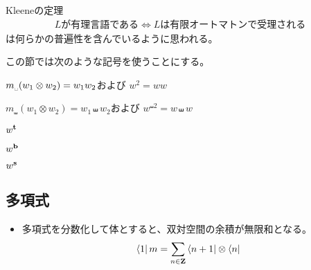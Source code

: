 	Kleeneの定理
	\begin{equation*}\begin{split}
		\text{$L$が有理言語である}
		\iff \text{$L$は有限オートマトンで受理される}
	\end{split}\end{equation*}
	は何らかの普遍性を含んでいるように思われる。

	この節では次のような記号を使うことにする。
	\begin{description}\setlength{\itemsep}{-1mm} %
		\item[連結による積] $m_\myspace(w_1\otimes w_2)=w_1w_2$および
		$w^2=ww$
		\item[シャッフル積] $m_\shuffle(w_1\otimes w_2)=w_1\shuffle w_2$および
		$w^{\shuffle2}=w\shuffle w$
		\item[転置] $w^{\mathbf{t}}$
		\item[Brzozowski微分] $w^{\mathbf{b}}$
		\item[シャッフル微分] $w^{\mathbf{s}}$
	\end{description} %

\subsection{多項式}\label{s2:多項式} %
	\begin{itemize}\setlength{\itemsep}{-1mm} %
		\item 多項式を分数化して体とすると、双対空間の余積が無限和となる。
		\begin{equation*}\begin{split}
			\mathinner{\langle{1}|}m = \sum_{n\in\mathbf{Z}}\mathinner{\langle{n+1}|}\otimes\mathinner{\langle{n}|}
		\end{split}\end{equation*}
	\end{itemize} %

